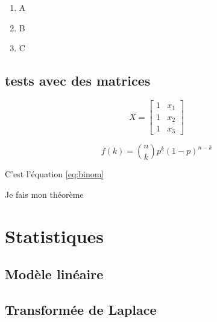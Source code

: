 \documentclass[]{book}
\providecommand{\tightlist}{%
  \setlength{\itemsep}{0pt}\setlength{\parskip}{0pt}}
\theoremstyle{definition}
\theoremstyle{definition}
\theoremstyle{definition}
\theoremstyle{remark}
\let\BeginKnitrBlock\begin \let\EndKnitrBlock\end
\begin{document}
\begin{enumerate}
\def\labelenumi{\arabic{enumi}.}
\tightlist
\item
  A
\item
  B
\item
  C
\end{enumerate}

\chapter{tests avec des matrices}\label{tests-avec-des-matrices}

\[X = \begin{bmatrix}1 & x_{1}\\
1 & x_{2}\\
1 & x_{3}
\end{bmatrix}\]

\begin{equation} 
  f\left(k\right) = \binom{n}{k} p^k\left(1-p\right)^{n-k}
  \label{eq:binom}
\end{equation}

C'est l'équation \eqref{eq:binom}

\BeginKnitrBlock{theorem}
\protect\hypertarget{thm:unnamed-chunk-1}{}{\label{thm:unnamed-chunk-1} }Je
fais mon théorème
\EndKnitrBlock{theorem}

\part{Statistiques}\label{part-statistiques}

\chapter{Modèle linéaire}\label{modele-lineaire}

\appendix


\chapter{Transformée de Laplace}\label{transformee-de-laplace}


\end{document}
